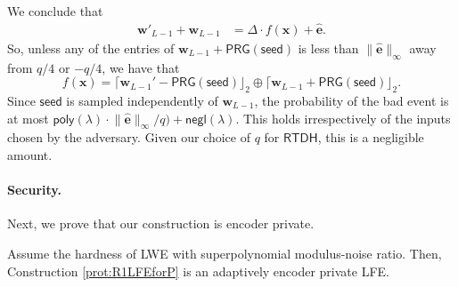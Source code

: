 \documentclass{theoretics}
\newcommand{\poly}{\mathsf{poly}}
\newcommand{\negl}{\mathsf{negl}}
\renewcommand{\sec}{\ensuremath{\lambda}}
\newcommand{\RTDH}{\mathsf{RTDH}}
\begin{document}
We conclude that
\begin{align}
\mathbf{w}'_{L-1}+\mathbf{w}_{L-1}
&=\Delta\cdot f(\mathbf{x})+\widehat{\mathbf e}.\label{eq45}
\end{align}
So, unless any of the entries of $\mathbf{w}_{L-1}+\mathsf{PRG}(\mathsf{seed})$ is less than $\lVert\widehat{\mathbf e}\rVert_\infty$ away from $q/4$ or $-q/4$, we have that \[f(\mathbf{x})=\lceil\mathbf{w}_{L-1}'-\mathsf{PRG}(\mathsf{seed})\rfloor_2\oplus \lceil\mathbf{w}_{L-1}+\mathsf{PRG}(\mathsf{seed})\rfloor_2.\] 
Since $\mathsf{seed}$ is sampled independently of $\mathbf{w}_{L-1}$, the probability of the bad event is at most $\poly(\sec)\cdot \lVert\widehat{\mathbf e}\rVert_\infty/q)+\negl(\sec)$. {This holds irrespectively of the inputs chosen by the adversary.} Given our choice of $q$ for $\RTDH$, this is a negligible amount. 

\paragraph{Security.} Next, we prove that our construction is encoder private.

\begin{theorem}
Assume the hardness of LWE with superpolynomial modulus-noise ratio. Then, Construction \ref{prot:R1LFEforP} is an adaptively encoder private LFE. 
\end{theorem}
\end{document}
